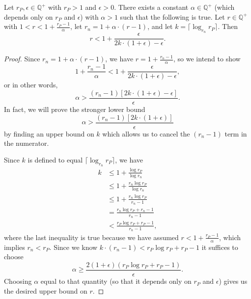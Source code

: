 \documentclass[]{article}
\newcommand{\ceil}[1]{\lceil{#1}\rceil}
\begin{document}
\begin{lemma}\label{lem:alpha}
  Let $r_P, \epsilon \in \mathbb{Q}^+$ with $r_P > 1$ and $\epsilon > 0$.
  There exists a constant $\alpha \in \mathbb{Q}^+$ (which depends only on $r_P$ and $\epsilon$) with $\alpha > 1$ such that the following is true.
  Let $r \in \mathbb{Q}^+$ with $1 < r < 1 + \frac{r_P - 1}{\alpha}$, let $r_n = 1 + \alpha \cdot (r - 1)$, and let $k = \ceil{\log_{r_n}{r_P}}$.
  Then
  \begin{equation*}
    r < 1 + \frac{\epsilon}{2k \cdot (1 + \epsilon) - \epsilon}.
  \end{equation*}
\end{lemma}
\begin{proof}
  Since $r_n = 1 + \alpha \cdot (r - 1)$, we have $r = 1 + \frac{r_n - 1}{\alpha}$, so we intend to show
  \begin{equation*}
    1 + \frac{r_n - 1}{\alpha} < 1 + \frac{\epsilon}{2k \cdot (1 + \epsilon) - \epsilon},
  \end{equation*}
  or in other words,
  \begin{equation*}
    \alpha > \frac{(r_n - 1) \left[2k \cdot (1 + \epsilon) - \epsilon\right]}{\epsilon}.
  \end{equation*}
  In fact, we will prove the stronger lower bound
  \begin{equation*}
    \alpha > \frac{(r_n - 1)\left[2k \cdot (1 + \epsilon)\right]}{\epsilon}
  \end{equation*}
  by finding an upper bound on $k$ which allows us to cancel the $(r_n - 1)$ term in the numerator.

  Since $k$ is defined to equal $\ceil{\log_{r_n}{r_P}}$, we have
  \begin{align*}
    k & \leq 1 + \frac{\log{r_P}}{\log{r_n}} \\
    & \leq 1 + \frac{r_n \log{r_P}}{\log{r_n}} \\
    & \leq 1 + \frac{r_n \log{r_P}}{r_n - 1} \\
    & = \frac{r_n \log{r_P} + r_n - 1}{r_n - 1} \\
    & < \frac{r_P \log{r_P} + r_P - 1}{r_n - 1},
  \end{align*}
  where the last inequality is true because we have assumed $r < 1 + \frac{r_P - 1}{\alpha}$, which implies $r_n < r_P$.
  Since we know $k \cdot (r_n - 1) < r_P \log r_P + r_P - 1$ it suffices to choose
  \begin{equation*}
    \alpha \geq \frac{2(1 + \epsilon)(r_P \log r_P + r_P - 1)}{\epsilon}.
  \end{equation*}
  Choosing $\alpha$ equal to that quantity (so that it depends only on $r_P$ and $\epsilon$) gives us the desired upper bound on $r$.
\end{proof}
\end{document}
